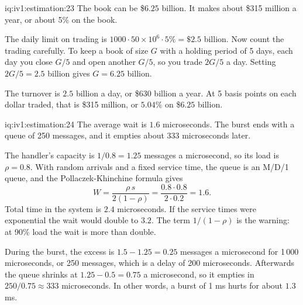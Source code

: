 \begin{solution}{iq:iv1:estimation:23}
The book can be \$$6.25$ billion. It makes about \$315 million a year, or about 5\% on the book.

The daily limit on trading is $1000 \cdot 50 \times 10^6 \cdot 5\% = \$2.5$ billion. Now count the trading carefully. To keep a book of size $G$ with a holding period of 5 days, each day you close $G/5$ and open another $G/5$, so you trade $2G/5$ a day. Setting $2G/5 = 2.5$ billion gives $G = 6.25$ billion.

The turnover is $2.5$ billion a day, or \$630 billion a year. At 5 basis points on each dollar traded, that is \$315 million, or $5.04\%$ on \$$6.25$ billion.

\end{solution}

\begin{solution}{iq:iv1:estimation:24}
The average wait is $1.6$ microseconds. The burst ends with a queue of 250 messages, and it empties about 333 microseconds later.

The handler's capacity is $1/0.8 = 1.25$ messages a microsecond, so its load is $\rho = 0.8$. With random arrivals and a fixed service time, the queue is an M/D/1 queue, and the Pollaczek-Khinchine formula gives
\[
W = \frac{\rho\, s}{2(1 - \rho)} = \frac{0.8 \cdot 0.8}{2 \cdot 0.2} = 1.6.
\]
Total time in the system is $2.4$ microseconds. If the service times were exponential the wait would double to $3.2$. The term $1/(1 - \rho)$ is the warning: at 90\% load the wait is more than double.

During the burst, the excess is $1.5 - 1.25 = 0.25$ messages a microsecond for 1\,000 microseconds, or 250 messages, which is a delay of 200 microseconds. Afterwards the queue shrinks at $1.25 - 0.5 = 0.75$ a microsecond, so it empties in $250/0.75 \approx 333$ microseconds. In other words, a burst of 1 ms hurts for about $1.3$ ms.

\end{solution}

